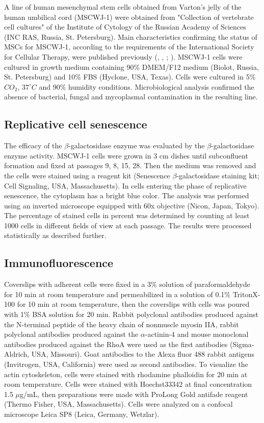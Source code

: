 \documentclass[alpha-refs]{wiley-article}
\begin{document}
A line of human mesenchymal stem cells obtained from Varton's jelly of the human umbilical cord (MSCWJ-1) were obtained from "Collection of vertebrate cell cultures" of the Institute of Cytology of the Russian Academy of Sciences (INC RAS, Russia, St. Petersburg).
Main characteristics confirming the status of MSCs for MSCWJ-1, according to the requirements of the International Society for Cellular Therapy, were published previously (\cite{krylova2017derivation}, \cite{koltsova2018dynamics}, \cite{dominici2006minimal}; \cite{sensebe2010mesenchymal}).
MSCWJ-1 cells were cultured in growth medium containing 90\% DMEM/F12 medium (Biolot, Russia, St. Petersburg) and 10\% FBS (Hyclone, USA, Texas).
Cells were cultured in 5\% $CO_2$, $37^{\circ}  C$ and 90\% humidity conditions.
Microbiological analysis confirmed the absence of bacterial, fungal and mycoplasmal contamination in the resulting line.

\subsection{Replicative cell senescence}

The efficacy of the $\beta$-galactosidase enzyme was evaluated by the $\beta$-galactosidase enzyme activity.
MSCWJ-1 cells were grown in 3 cm dishes until subconfluent formation and fixed at passages 9, 8, 15, 28.
Then the medium was removed and the cells were stained using a reagent kit (Senescence $\beta$-galactosidase staining kit; Cell Signaling, USA, Massachusetts).
In cells entering the phase of replicative senescence, the cytoplasm has a bright blue color.
The analysis was performed using an inverted microscope equipped with 60x objective (Nicon, Japan, Tokyo).
The percentage of stained cells in percent was determined by counting at least 1000 cells in different fields of view at each passage.
The results were processed statistically as described further.

\subsection{Immunofluorescence}

Coverslips with adherent cells were fixed in a 3\% solution of paraformaldehyde for 10 min at room temperature and permeabilized in a solution of 0.1\% TritonX-100 for 10 min at room temperature, then the coverslips with cells was poured with 1\% BSA solution for 20 min.
Rabbit polyclonal antibodies produced against the N-terminal peptide of the heavy chain of nonmuscle myosin IIA, rabbit polyclonal antibodies produced against the $\alpha$-actinin-4 and mouse monoclonal antibodies produced against the RhoA were used as the first antibodies (Sigma-Aldrich, USA, Missouri).
Goat antibodies to the Alexa fluor 488 rabbit antigens (Invitrogen, USA, California) were used as second antibodies.
To visualize the actin cytoskeleton, cells were stained with rhodamine phalloidin for 20 min at room temperature.
Cells were stained with Hoechst33342 at final concentration 1.5 $\mu$g/mL, then preparations were made with ProLong Gold antifade reagent (Thermo Fisher, USA, Massachusetts).
Cells were analyzed on a confocal microscope Leica SP8 (Leica, Germany, Wetzlar).
\end{document}
